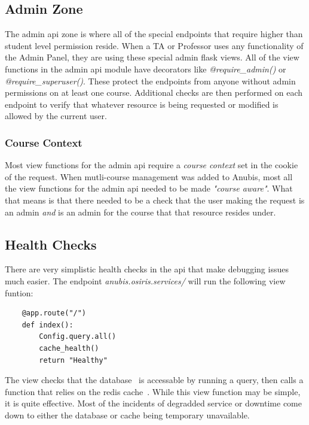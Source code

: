 \subsection{Admin Zone}\label{sec:api-admin-zone}
The admin api zone is where all of the special endpoints that require higher than student level permission reside.
When a TA or Professor uses any functionality of the Admin Panel, they are using these special
admin flask views.
All of the view functions in the admin api module have decorators like \textit{@require\_admin()} or 
\textit{@require\_superuser()}.
These protect the endpoints from anyone without admin permissions on at least one course.
Additional checks are then performed on each endpoint to verify that whatever resource is being requested
or modified is allowed by the current user.

\subsubsection{Course Context}\label{sec:course-context}
Most view functions for the admin api require a \textit{course context} set in the cookie of the request.
When mutli-course management was added to Anubis, most all the view functions for the admin api
needed to be made \textit{"course aware"}. 
What that means is that there needed to be a check that the user making the request is an admin \textit{and} is
an admin for the course that that resource resides under.

\subsection{Health Checks}\label{sec:api-health-checks}
There are very simplistic health checks in the api that make debugging issues much easier.
The endpoint \textit{anubis.osiris.services/} will run the following view funtion:

\begin{verbatim}
    @app.route("/")
    def index():
        Config.query.all()
        cache_health()
        return "Healthy"
\end{verbatim}

The view checks that the database~ is accessable by running a query, then calls a function that relies on the 
redis cache~.
While this view function may be simple, it is quite effective.
Most of the incidents of degradded service or downtime come down to either the database or cache being temporary
unavailable.


